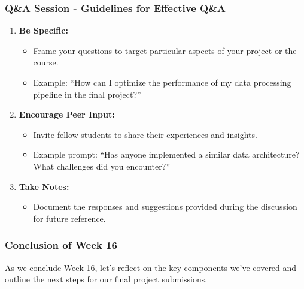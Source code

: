 \documentclass[aspectratio=169]{beamer}
\begin{document}
\begin{frame}[fragile]
    \frametitle{Q\&A Session - Guidelines for Effective Q\&A}
    \begin{enumerate}
        \item \textbf{Be Specific:}
            \begin{itemize}
                \item Frame your questions to target particular aspects of your project or the course.
                \item Example: ``How can I optimize the performance of my data processing pipeline in the final project?''
            \end{itemize}
        \item \textbf{Encourage Peer Input:}
            \begin{itemize}
                \item Invite fellow students to share their experiences and insights.
                \item Example prompt: ``Has anyone implemented a similar data architecture? What challenges did you encounter?''
            \end{itemize}
        \item \textbf{Take Notes:}
            \begin{itemize}
                \item Document the responses and suggestions provided during the discussion for future reference.
            \end{itemize}
    \end{enumerate}
\end{frame}

\begin{frame}[fragile]
    \frametitle{Conclusion of Week 16}
    As we conclude Week 16, let's reflect on the key components we've covered and outline the next steps for our final project submissions.
\end{frame}
\end{document}
